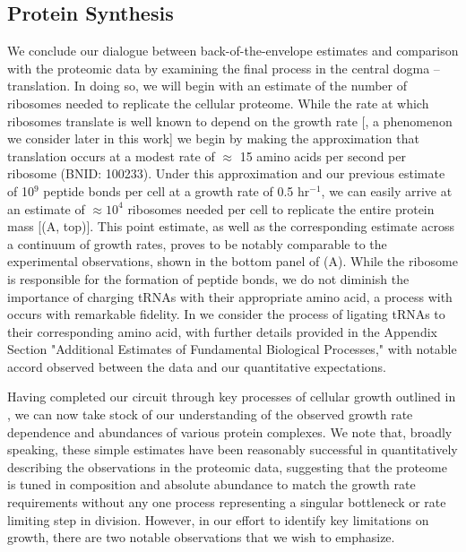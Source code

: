 \subsection{Protein Synthesis}
We conclude our dialogue between back-of-the-envelope estimates and
comparison with the proteomic data by examining the final process in the
central dogma -- translation. In doing so, we will begin with an estimate of
the number of ribosomes needed to replicate the cellular proteome. While the
rate at which ribosomes translate is well known to depend on the growth
rate [\cite{dai2018}, a phenomenon we consider later in this work] we begin by making
the approximation that translation occurs at a modest rate of $\approx$ 15
amino acids per second per ribosome (BNID: 100233). Under this approximation
and our previous estimate of 10$^{9}$ peptide bonds per cell at a growth rate
of 0.5 hr$^{-1}$, we can easily arrive at an estimate of $\approx 10^4$
ribosomes needed per cell to replicate the entire protein mass
[(A, top)]. This point estimate, as well as the
corresponding estimate across a continuum of growth rates, proves to be
notably comparable to the experimental observations, shown in the bottom
panel of (A). While the ribosome is responsible for
the formation of peptide bonds, we do not diminish the importance of charging
tRNAs with their appropriate amino acid, a process with occurs with
remarkable fidelity. In  we consider the process of ligating tRNAs
to their corresponding amino acid, with further details provided in the Appendix Section "Additional Estimates of Fundamental Biological Processes," with notable accord observed between the
data and our quantitative expectations.

Having completed our circuit through key processes of cellular growth
outlined in , we can now take stock of our understanding of the
observed growth rate dependence and abundances of various protein complexes. We
note that, broadly speaking, these simple estimates have been reasonably successful in
quantitatively describing the observations in the proteomic data, suggesting
that the proteome is tuned in composition and absolute abundance to match the
growth rate requirements without any one process representing a singular
bottleneck or rate limiting step in division. However, in our effort to identify
key limitations on growth, there are two notable observations that we
wish to emphasize.

